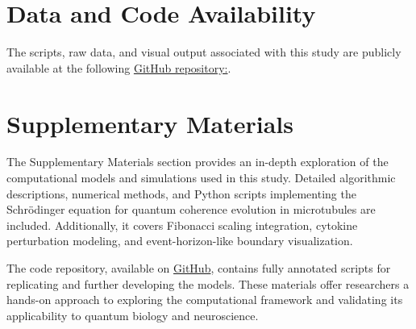 \section{Data and Code Availability}
The scripts, raw data, and visual output associated with this study are publicly available at
the following \href{https://github.com/TheonlyqueenAC/Microtubule\_Simulation}{GitHub repository:}.
\section{Supplementary Materials}
The Supplementary Materials section provides an in-depth exploration of the computational models and simulations used in this study. Detailed algorithmic descriptions, numerical methods, and Python scripts implementing the Schrödinger equation for quantum coherence evolution in microtubules are included. Additionally, it covers Fibonacci scaling integration, cytokine perturbation modeling, and event-horizon-like boundary visualization.

The code repository, available on \href{https://github.com/TheonlyqueenAC/Microtubule_Simulation}{GitHub}, contains fully annotated scripts for replicating and further developing the models. These materials offer researchers a hands-on approach to exploring the computational framework and validating its applicability to quantum biology and neuroscience.


